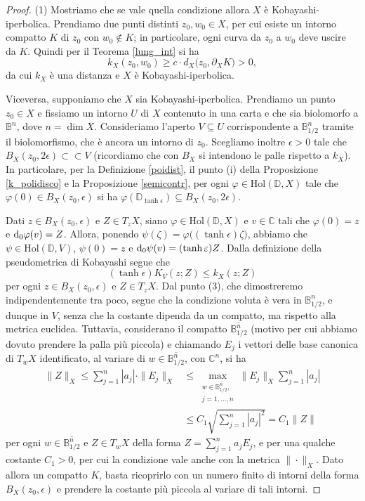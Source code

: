 \begin{proof}
    (1) Mostriamo che se vale quella condizione allora $X$ è Kobayashi-iperbolica. Prendiamo due punti distinti $z_0,w_0\in X$, per cui esiste un intorno compatto $K$ di $z_0$ con $w_0\not\in K$; in particolare, ogni curva da $z_0$ a $w_0$ deve uscire da $K$. Quindi per il Teorema \ref{lung_int} si ha
    $$k_X(z_0,w_0) \ge c\cdot d_X\big(z_0,\partial_X K)>0,$$
    da cui $k_X$ è una distanza e $X$ è Kobayashi-iperbolica.

    Viceversa, supponiamo che $X$ sia Kobayashi-iperbolica. Prendiamo un punto $z_0\in X$ e fissiamo un intorno $U$ di $X$ contenuto in una carta e che sia biolomorfo a $\mathbb{B}^n$, dove $n=\dim{X}$. Consideriamo l'aperto $V\subseteq U$ corrispondente a $\mathbb{B}_{1/2}^n$ tramite il biolomorfismo, che è ancora un intorno di $z_0$. Scegliamo inoltre $\epsilon>0$ tale che $B_X(z_0,2\epsilon)\subset\subset V$ (ricordiamo che con $B_X$ si intendono le palle rispetto a $k_X$). In particolare, per la Definizione \ref{poidist}, il punto (i) della Proposizione \ref{k_polidisco} e la Proposizione \ref{semicontr}, per ogni $\varphi\in\text{Hol}(\mathbb{D},X)$ tale che $\varphi(0)\in B_X(z_0,\epsilon)$ si ha $\varphi(\mathbb{D}_{\tanh{\epsilon}})\subseteq B_X(z_0,2\epsilon)$.

    Dati $z\in B_X(z_0,\epsilon)$ e $Z\in T_zX$, siano $\varphi\in\text{Hol}(\mathbb{D},X)$ e $v\in\mathbb{C}$ tali che $\varphi(0)=z$ e $\mathop{}\!\mathrm{d}_0\varphi(v)=Z$. Allora, ponendo $\psi(\zeta)=\varphi\big((\tanh{\epsilon})\zeta\big)$, abbiamo che $\psi\in\text{Hol}(\mathbb{D},V)$, $\psi(0)=z$ e $\mathop{}\!\mathrm{d}_0\psi(v)=(\tanh{\varepsilon})Z$. Dalla definizione della pseudometrica di Kobayashi segue che
    $$(\tanh{\epsilon})K_V(z;Z) \le k_X(z;Z)$$
    per ogni $z\in B_X(z_0,\epsilon)$ e $Z\in T_zX$. Dal punto (3), che dimostreremo indipendentemente tra poco, segue che la condizione voluta è vera in $\mathbb{B}_{1/2}^n$, e dunque in $V$, senza che la costante dipenda da un compatto, ma rispetto alla metrica euclidea. Tuttavia, considerano il compatto $\overline{\mathbb{B}_{1/2}^n}$ (motivo per cui abbiamo dovuto prendere la palla più piccola) e chiamando $E_j$ i vettori delle base canonica di $T_wX$ identificato, al variare di $w\in\overline{\mathbb{B}_{1/2}^n}$, con $\mathbb{C}^n$, si ha
    \begin{align*}
        \|Z\|_X \le \sum_{j=1}^n |a_j|\cdot\|E_j\|_X &\le \max_{\substack{w\in\overline{\mathbb{B}_{1/2}^n},\\j=1,\dots,n}}\|E_j\|_X \sum_{j=1}^n |a_j| \\
        &\le C_1\sqrt{\sum_{j=1}^n |a_j|^2}=C_1\|Z\|
    \end{align*}
    per ogni $w\in\overline{\mathbb{B}_{1/2}^n}$ e $Z\in T_wX$ della forma $Z=\displaystyle\sum_{j=1}^n a_jE_j$, e per una qualche costante $C_1>0$, per cui la condizione vale anche con la metrica $\|\cdot\|_X$. Dato allora un compatto $K$, basta ricoprirlo con un numero finito di intorni della forma $B_X(z_0,\epsilon)$ e prendere la costante più piccola al variare di tali intorni.


\end{proof}

